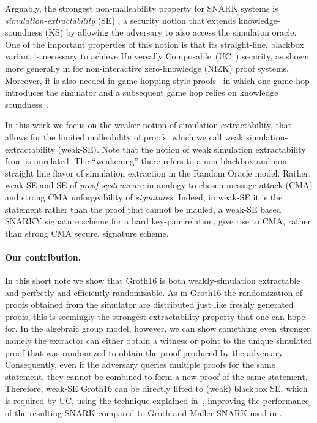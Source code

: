 \documentclass[a4paper, 11pt]{article}
\newcommand{\MK}[1]{}
\newcommand{\Gro}{\textsf{Groth16}}
\begin{document}
%
%

Arguably, the strongest non-malleability property for SNARK systems is
\emph{simulation-extractability} (SE) \cite{sahai1999non,
  de2001robust}, a security notion that extends knowledge-soundness
(KS) by allowing the adversary to also access the simulaton
oracle. One of the important properties of this notion is that its
straight-line, blackbox variant is necessary to achieve Universally Composable~(UC~\cite{uc}) security,
as shown more generally in
\cite{canetti2002universally,groth2006perfect,groth2006simulation} for
non-interactive zero-knowledge (NIZK) proof systems. Moreover, it is
also needed in game-hopping style proofs~\cite{DBLP:journals/iacr/Shoup04} in which one game hop
introduces the simulator and a subsequent game hop relies on knowledge
soundness~\cite{kosba2016hawk,
  DBLP:conf/ccs/CamenischDD17}.



In this work we focus on the weaker notion of
simulation-extractability, that allows for the limited malleability of
proofs, which we call weak simulation-extractability (weak-SE). Note
that the notion of weak simulation extractability from
\cite{DBLP:conf/indocrypt/FaustKMV12} is unrelated. The ``weakening''
there refers to a non-blackbox and non-straight line flavor of
simulation extraction in the Random Oracle model.  Rather, weak-SE and
SE of \emph{proof systems} are in analogy to chosen message attack
(CMA) and strong CMA unforgeability of \emph{signatures}. Indeed, in weak-SE it is
the statement rather than the proof that cannot be mauled, a weak-SE based
SNARKY signature scheme for a hard key-pair relation, give rise to CMA, rather
than strong CMA secure, signature scheme.\MK{We could define and prove this.}

  \paragraph{Our contribution.}

  In this short note we show that \Gro{} is both weakly-simulation
  extractable and perfectly and efficiently randomizable. As in \Gro{}
  the randomization of proofs obtained from the simulator are
  distributed just like freshly generated proofs, this is seemingly
  the strongest extractability property that one can hope for. In the
  algebraic group model, however, we can show something even stronger,
  namely the extractor can either obtain a witness or point to the
  unique simulated proof that was randomized to obtain the proof
  produced by the adversary. Consequently, even if the adversary
  queries multiple proofs for the same statement, they cannot be
  combined to form a new proof of the same statement. Therefore,
  weak-SE \Gro{} can be directly lifted to (weak) blackbox SE, which
  is required by UC, using the technique explained
  in~\cite{baghery2019efficiency}, improving the performance of the
  resulting SNARK compared to Groth and Maller SNARK used in
  \cite{baghery2019efficiency}.
\end{document}
